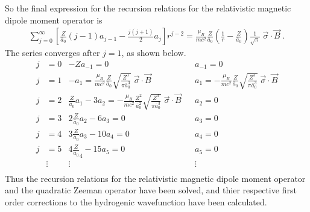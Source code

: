     \noindent So the final expression for the recursion relations for the relativistic magnetic dipole moment operator is 
    \begin{align}
        \sum_{j = 0}^\infty \left[ \frac{Z}{\bar{a}_0}(j-1)a_{j-1} - \frac{j(j+1)}{2} a_j \right] r^{j-2} = \frac{\mu_B}{mc^2}\frac{Z}{\bar{a}_0} \left(\frac{1}{r} - \frac{Z}{\bar{a}_0} \right) \frac{1}{\sqrt{\pi}}\; \vec{\sigma} \cdot \vec{B}\;.
    \end{align}
    \noindent The series converges after $j = 1$, as shown below.
    \begin{align*}
        j &= 0 & -Za_{-1} = 0& &a_{-1} = 0\\ \nonumber
        j &= 1 & -a_1 = \frac{\mu_B}{mc^2}\frac{Z}{\bar{a}_0}  \sqrt{\frac{Z^3}{\pi \bar{a}_0^3}}\; \vec{\sigma} \cdot \vec{B} & &a_{1} = - \frac{\mu_B}{mc^2}\frac{Z}{\bar{a}_0} \sqrt{\frac{Z^3}{\pi \bar{a}_0^3}}\; \vec{\sigma} \cdot \vec{B}\\ \nonumber
        j &= 2 & \frac{Z}{\bar{a}_0}a_1 - 3a_2 = - \frac{\mu_B}{mc^2}\frac{Z^2}{\bar{a}_0^2}  \sqrt{\frac{Z^3}{\pi \bar{a}_0^3}}\; \vec{\sigma} \cdot \vec{B} && a_2 = 0\\ \nonumber
        j &= 3 & 2\frac{Z}{\bar{a}_0}a_2 - 6a_3 = 0&& a_3 = 0\\ \nonumber
        j &= 4 & 3\frac{Z}{\bar{a}_0}a_3 - 10a_4 =0 && a_4 = 0\\ \nonumber
        j &= 5 & 4\frac{Z}{\bar{a}_0}_4 - 15a_5 = 0 && a_5 = 0 \\ \nonumber
        & \vdots & \vdots && \vdots \\
    \end{align*}
    \noindent Thus the recursion relations for the relativistic magnetic dipole moment operator and the quadratic Zeeman operator have been solved, and thier respective first order corrections to the hydrogenic wavefunction have been calculated.

